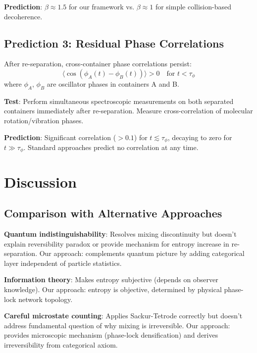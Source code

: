 \textbf{Prediction}: $\beta \approx 1.5$ for our framework vs. $\beta \approx 1$ for simple collision-based decoherence.

\subsection{Prediction 3: Residual Phase Correlations}

\begin{proposition}
After re-separation, cross-container phase correlations persist:
\begin{equation}
\langle \cos(\phi_A(t) - \phi_B(t)) \rangle > 0 \quad \text{for } t < \tau_{\phi}
\end{equation}
where $\phi_A$, $\phi_B$ are oscillator phases in containers A and B.
\end{proposition}

\textbf{Test}: Perform simultaneous spectroscopic measurements on both separated containers immediately after re-separation. Measure cross-correlation of molecular rotation/vibration phases.

\textbf{Prediction}: Significant correlation ($> 0.1$) for $t \lesssim \tau_{\phi}$, decaying to zero for $t \gg \tau_{\phi}$. Standard approaches predict no correlation at any time.

\section{Discussion}

\subsection{Comparison with Alternative Approaches}

\textbf{Quantum indistinguishability}: Resolves mixing discontinuity but doesn't explain reversibility paradox or provide mechanism for entropy increase in re-separation. Our approach: complements quantum picture by adding categorical layer independent of particle statistics.

\textbf{Information theory}: Makes entropy subjective (depends on observer knowledge). Our approach: entropy is objective, determined by physical phase-lock network topology.

\textbf{Careful microstate counting}: Applies Sackur-Tetrode correctly but doesn't address fundamental question of why mixing is irreversible. Our approach: provides microscopic mechanism (phase-lock densification) and derives irreversibility from categorical axiom.

